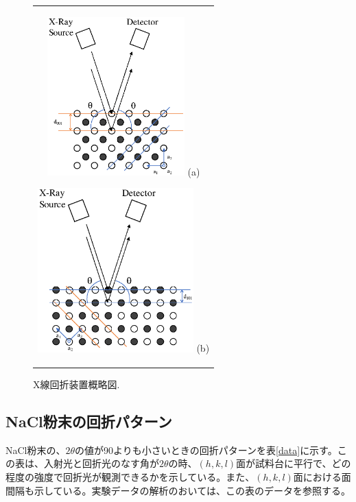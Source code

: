 \documentclass[11pt,a4j,uplatex]{jsarticle}
\begin{document}
\begin{figure}[ht]
 \centering
 \begin{tabular}{c}

  \begin{minipage}{0.5\hsize}
   \centering
   \includegraphics[clip, width=5.3cm]{2theta.eps}
   \hspace{2cm} (a)
  \end{minipage}

  \begin{minipage}{0.5\hsize}
   \centering
   \includegraphics[clip, width=6cm]{2theta3.eps}
   \hspace{2cm} (b)
  \end{minipage}

 \end{tabular}
 \caption{X線回折装置概略図.}
 \label{thetatheta}

\end{figure}

\newpage
\subsection{NaCl粉末の回折パターン}

NaCl粉末の、$2\theta$の値が90よりも小さいときの回折パターンを表\ref{data}に示す。この表は、入射光と回折光のなす角が$2\theta$の時、$(h,k,l)$面が試料台に平行で、どの程度の強度で回折光が観測できるかを示している。また、$(h,k,l)$面における面間隔も示している。実験データの解析のおいては、この表のデータを参照する。
\end{document}
